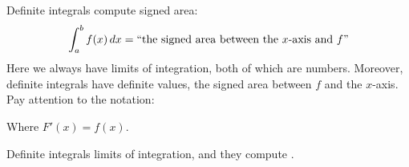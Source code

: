 \documentclass{ximera}
\begin{document}
Definite integrals compute signed area:
\[
\int_a^b f(x) \,d x = \text{``the signed area between the $x$-axis and $f$''}
\]
Here we always have limits of integration, both of which are
numbers. Moreover, definite integrals have definite values, the signed
area between $f$ and the $x$-axis. Pay attention to the notation:
\begin{center}
\end{center}
Where $F'(x) = f(x)$.
\begin{explanation}%
  Definite integrals  limits of integration, and they compute
  .
\end{explanation}
\end{document}
